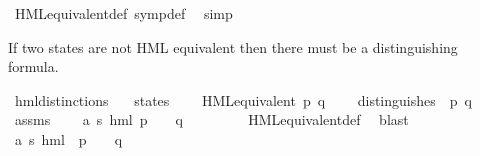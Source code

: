 \begin{isabellebody}
%
\isadelimproof
%
\endisadelimproof
%
\isatagproof
{}\isamarkupfalse%
\ HML{\isacharunderscore}{\kern0pt}equivalent{\isacharunderscore}{\kern0pt}def\ symp{\isacharunderscore}{\kern0pt}def\ \isamarkupfalse%
\ simp%
\endisatagproof
{\isafoldproof}%
%
\isadelimproof
%
\endisadelimproof
%
\begin{isamarkuptext}%
If two states are not HML equivalent then there must be a
  distinguishing formula.%
\end{isamarkuptext}\isamarkuptrue%
\isamarkupfalse%
\ hml{\isacharunderscore}{\kern0pt}distinctions{\isacharcolon}{\kern0pt}\isanewline
\ \ \ state{\isacharcolon}{\kern0pt}{\isacharcolon}{\kern0pt}{\isachardoublequoteopen}{\isacharprime}{\kern0pt}s{\isachardoublequoteclose}\isanewline
\ \ \ {\isacartoucheopen}{\isasymnot}\ HML{\isacharunderscore}{\kern0pt}equivalent\ p\ q{\isacartoucheclose}\isanewline
\ \ \ {\isacartoucheopen}{\isasymexists}{\isasymphi}{\isachardot}{\kern0pt}\ distinguishes\ {\isasymphi}\ p\ q{\isacartoucheclose}\isanewline
%
\isadelimproof
%
\endisadelimproof
%
\isatagproof
{}\isamarkupfalse%
{\isacharminus}{\kern0pt}\isanewline
\ \ \isamarkupfalse%
\ assms\ \isamarkupfalse%
\ {\isachardoublequoteopen}{\isasymnot}\ {\isacharparenleft}{\kern0pt}{\isasymforall}\ {\isasymphi}{\isacharcolon}{\kern0pt}{\isacharcolon}{\kern0pt}{\isacharparenleft}{\kern0pt}{\isacharprime}{\kern0pt}a{\isacharcomma}{\kern0pt}\ {\isacharprime}{\kern0pt}s{\isacharparenright}{\kern0pt}\ hml{\isachardot}{\kern0pt}\ {\isacharparenleft}{\kern0pt}p\ {\isasymTurnstile}\ {\isasymphi}{\isacharparenright}{\kern0pt}\ {\isasymlongleftrightarrow}\ {\isacharparenleft}{\kern0pt}q\ {\isasymTurnstile}\ {\isasymphi}{\isacharparenright}{\kern0pt}{\isacharparenright}{\kern0pt}{\isachardoublequoteclose}\ \isanewline
\ \ \ \ \isamarkupfalse%
\ HML{\isacharunderscore}{\kern0pt}equivalent{\isacharunderscore}{\kern0pt}def\ \isamarkupfalse%
\ blast\isanewline
\ \ \isamarkupfalse%
\ \isamarkupfalse%
\ {\isasymphi}{\isacharcolon}{\kern0pt}{\isacharcolon}{\kern0pt}{\isachardoublequoteopen}{\isacharparenleft}{\kern0pt}{\isacharprime}{\kern0pt}a{\isacharcomma}{\kern0pt}\ {\isacharprime}{\kern0pt}s{\isacharparenright}{\kern0pt}\ hml{\isachardoublequoteclose}\ \ {\isachardoublequoteopen}{\isacharparenleft}{\kern0pt}p\ {\isasymTurnstile}\ {\isasymphi}{\isacharparenright}{\kern0pt}\ {\isasymnoteq}\ {\isacharparenleft}{\kern0pt}q\ {\isasymTurnstile}\ {\isasymphi}{\isacharparenright}{\kern0pt}{\isachardoublequoteclose}\ \isamarkupfalse%

\end{isabellebody}
